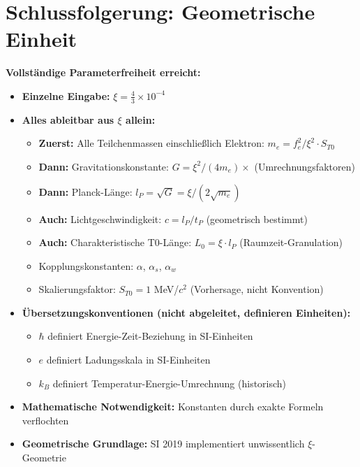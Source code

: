 	\section{Schlussfolgerung: Geometrische Einheit}
	
	\begin{keyresult}
		\textbf{Vollständige Parameterfreiheit erreicht:}
		\begin{itemize}
			\item \textbf{Einzelne Eingabe:} $\xi = \frac{4}{3} \times 10^{-4}$
			
			\item \textbf{Alles ableitbar aus $\xi$ allein:}
			\begin{itemize}
				\item \textbf{Zuerst:} Alle Teilchenmassen einschließlich Elektron: $m_e = f_e^2/\xi^2 \cdot S_{T0}$
				\item \textbf{Dann:} Gravitationskonstante: $G = \xi^2/(4m_e) \times$ (Umrechnungsfaktoren)
				\item \textbf{Dann:} Planck-Länge: $l_P = \sqrt{G} = \xi/(2\sqrt{m_e})$
				\item \textbf{Auch:} Lichtgeschwindigkeit: $c = l_P/t_P$ (geometrisch bestimmt)
				\item \textbf{Auch:} Charakteristische T0-Länge: $L_0 = \xi \cdot l_P$ (Raumzeit-Granulation)
				\item Kopplungskonstanten: $\alpha$, $\alpha_s$, $\alpha_w$
				\item Skalierungsfaktor: $S_{T0} = 1$ MeV/$c^2$ (Vorhersage, nicht Konvention)
			\end{itemize}
			
			\item \textbf{Übersetzungskonventionen (nicht abgeleitet, definieren Einheiten):}
			\begin{itemize}
				\item $\hbar$ definiert Energie-Zeit-Beziehung in SI-Einheiten
				\item $e$ definiert Ladungsskala in SI-Einheiten
				\item $k_B$ definiert Temperatur-Energie-Umrechnung (historisch)
			\end{itemize}
			
			\item \textbf{Mathematische Notwendigkeit:} Konstanten durch exakte Formeln verflochten
			
			\item \textbf{Geometrische Grundlage:} SI 2019 implementiert unwissentlich $\xi$-Geometrie
		\end{itemize}
	\end{keyresult}
	
